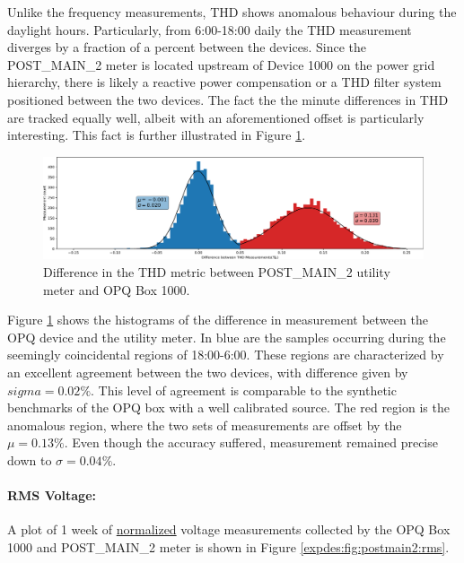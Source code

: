 Unlike the frequency measurements, THD shows anomalous behaviour during the daylight hours.
Particularly, from 6:00-18:00 daily the THD measurement diverges by a fraction of a percent between the devices.
Since the POST\_MAIN\_2 meter is located upstream of Device 1000 on the power grid hierarchy, there is likely a reactive power compensation or a THD filter system positioned between the two devices.
The fact the the minute differences in THD are tracked equally well, albeit with an aforementioned offset is particularly interesting.
This fact is further illustrated in Figure \ref{expdes:fig:postmain2:thd_diff}.

\begin{figure}[ht!]
    \centering
    \includegraphics[width=1\linewidth]{img/napali_eval/gt/gt_thd_diff.pdf}
    \caption{Difference in the THD metric between POST\_MAIN\_2 utility meter and OPQ Box 1000.}
    \label{expdes:fig:postmain2:thd_diff}
\end{figure}

Figure \ref{expdes:fig:postmain2:thd_diff} shows the histograms of the difference in measurement between the OPQ device and the utility meter.
In blue are the samples occurring during the seemingly coincidental regions of 18:00-6:00.
These regions are characterized by an excellent agreement between the two devices, with difference given by $sigma =0.02\%$.
This level of agreement is comparable to the synthetic benchmarks of the OPQ box with a well calibrated source.
The red region is the anomalous region, where the two sets of measurements are offset by the $\mu = 0.13\%$.
Even though the accuracy suffered, measurement remained precise down to $\sigma=0.04\%$.

\paragraph{RMS Voltage:}
A plot of 1 week of \underline{normalized} voltage measurements collected by the OPQ Box 1000 and POST\_MAIN\_2 meter is shown in Figure \ref{expdes:fig:postmain2:rms}.

